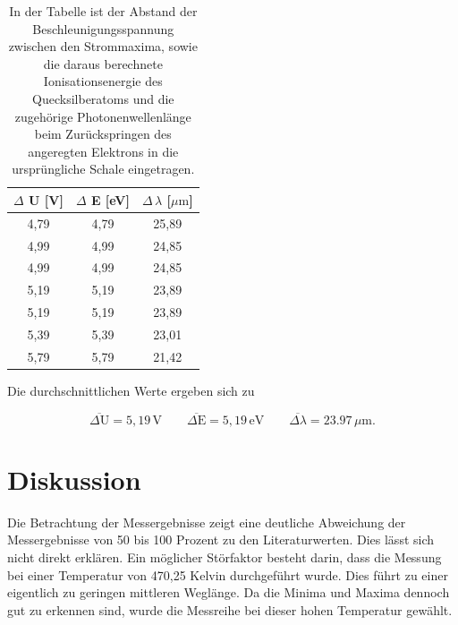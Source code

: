 \documentclass[titlepage = firstcover]{scrartcl}
\begin{document}
            \begin{table}[h]
                \centering
                \caption{In der Tabelle ist der Abstand der Beschleunigungsspannung zwischen den Strommaxima, sowie die daraus berechnete Ionisationsenergie des Quecksilberatoms und die zugehörige Photonenwellenlänge beim Zurückspringen des angeregten Elektrons in die ursprüngliche Schale eingetragen.}
                \label{tab:TabelleHertz}

                \begin{tabular}{c c c}
                    \toprule
                    {$\Delta$ U [V]} & {$\Delta$ E [eV]} & {$\Delta \, \lambda$ [$\mu \text{m}$]} \\
                    \midrule
                        4,79 & 4,79 & 25,89 \\
                        4,99 & 4,99 & 24,85 \\
                        4,99 & 4,99 & 24,85 \\
                        5,19 & 5,19 & 23,89 \\
                        5,19 & 5,19 & 23,89 \\
                        5,39 & 5,39 & 23,01 \\
                        5,79 & 5,79 & 21,42 \\
                    \bottomrule
                \end{tabular}

            \end{table}

            \FloatBarrier
            \noindent
            Die durchschnittlichen Werte ergeben sich zu

            \begin{equation*}
                \overline{\Delta \text{U}} = 5,19 \, \text{V} \qquad \overline{\Delta \text{E}} = 5,19 \, \text{eV} \qquad \overline{\Delta \lambda} = 23.97 \, \mu \text{m.}
            \end{equation*}

        
    \newpage
    \section{Diskussion}
        Die Betrachtung der Messergebnisse zeigt eine deutliche Abweichung der Messergebnisse von 50 bis 100 Prozent zu den Literaturwerten. Dies lässt sich nicht direkt erklären. Ein möglicher 
        Störfaktor besteht darin, dass die Messung bei einer Temperatur von 470,25 Kelvin durchgeführt wurde. Dies führt zu einer eigentlich zu geringen mittleren Weglänge. Da die Minima und 
        Maxima dennoch gut zu erkennen sind, wurde die Messreihe bei dieser hohen Temperatur gewählt.
\end{document}
